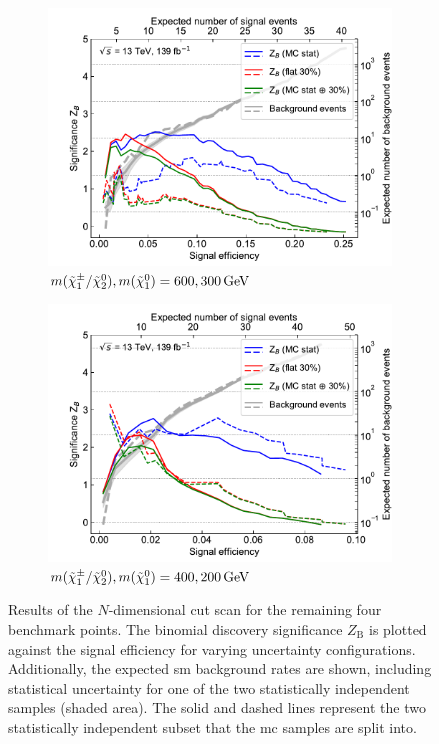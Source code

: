 \begin{figure}[hb]
\begin{subfigure}[b]{0.5\linewidth}
		\centering\includegraphics[width=1.0\textwidth]{N-1_cut_scan/z_vs_effs_600_300.pdf}
		\caption{$m(\charg/\neutr), m(\lsp) =  600, \SI{300}{\GeV}$}
	\end{subfigure}\hfill
	\begin{subfigure}[b]{0.5\linewidth}
		\centering\includegraphics[width=1.0\textwidth]{N-1_cut_scan/z_vs_effs_400_200.pdf}
		\caption{$m(\charg/\neutr), m(\lsp) =  400, \SI{200}{\GeV}$}
	\end{subfigure}\hfill

	\caption[N-dimensional cut scan results]{Results of the $N$-dimensional cut scan for the remaining four benchmark points. The binomial discovery significance $Z_\mathrm{B}$ is plotted against the signal efficiency for varying uncertainty configurations. Additionally, the expected \gls{sm} background rates are shown, including statistical uncertainty for one of the two statistically independent samples (shaded area). The solid and dashed lines represent the two statistically independent subset that the \gls{mc} samples are split into.}
	\label{fig:results_z_vs_eff_rest}
\end{figure}


